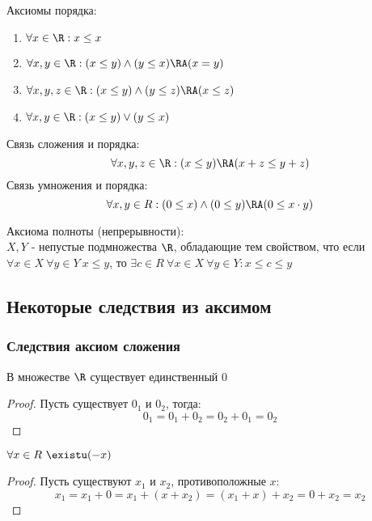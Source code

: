 \documentclass[a4paper, 14pt]{article}
\begin{document}
    Аксиомы порядка:
    \begin{enumerate}
        \item $\forall x \in \R: x \leq x$
        \item $\forall x,y \in \R: (x \leq y) \land (y \leq x) \RA (x=y)$
        \item $\forall x,y,z \in \R: (x \leq y) \land (y \leq z) \RA (x \leq z)$
        \item $\forall x,y \in \R: (x \leq y) \lor (y \leq x)$
    \end{enumerate}    

    Связь сложения и порядка: \[\forall x,y,z \in \R: (x \leq y) \RA (x + z \leq y + z)\]
    Связь умножения и порядка: \[\forall x,y \in R: (0 \leq x) \land (0 \leq y) \RA (0 \leq x \cdot y)\]

    Аксиома полноты (непрерывности): \\
    { $X, Y$ - непустые подмножества $\R$, обладающие тем свойством, что если $\forall x \in X \ \forall y \in Y \ x \leq y$,
    то $\exists c \in R \ \forall x \in X \ \forall y \in Y: x \leq c \leq y$}

    \subsection{Некоторые следствия из аксимом}

    \subsubsection*{Следствия аксиом сложения}

    \begin{theorem}
        В множестве $\R$ существует единственный $0$
    \end{theorem}
    \begin{proof}
        Пусть существует $0_1$ и $0_2$, тогда:
        \begin{equation*}
            0_1 = 0_1 + 0_2 = 0_2 + 0_1 = 0_2    
        \end{equation*}
    \end{proof}

    \begin{theorem}
        $\forall x \in R \ \existu (-x)$ 
    \end{theorem}
    \begin{proof}
        Пусть существуют $x_1$ и $x_2$, противоположные $x$:
        \begin{equation*}
            x_1 = x_1 + 0 = x_1 + (x + x_2) = (x_1 + x) + x_2 = 0 + x_2 = x_2
        \end{equation*}
    \end{proof}
\end{document}
